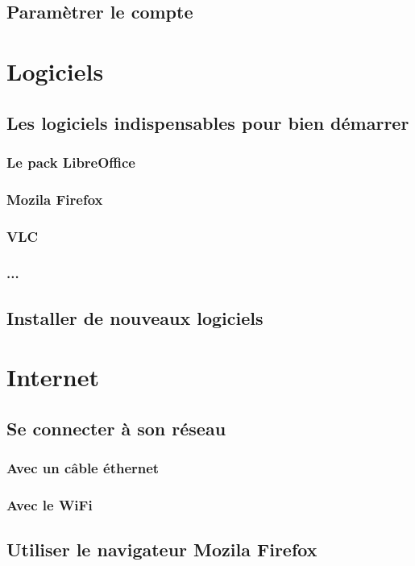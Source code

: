 \documentclass[12pt]{book}
\begin{document}
\section{Paramètrer le compte}

\newpage
\chapter{Logiciels}
\section{Les logiciels indispensables pour bien démarrer}
	\subsection{Le pack LibreOffice}
	\subsection{Mozila Firefox}
	\subsection{VLC}
	\subsection{...}

\section{Installer de nouveaux logiciels}

\newpage
\chapter{Internet}
\section{Se connecter à son réseau}
	\subsection{Avec un câble éthernet}
	\subsection{Avec le WiFi}

\section{Utiliser le navigateur Mozila Firefox}
\end{document}
